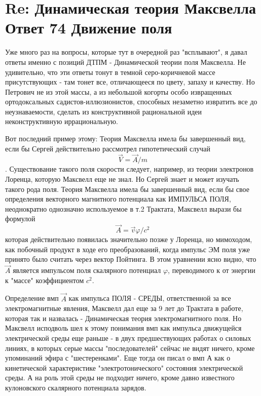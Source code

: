 \documentclass{article}
\begin{document}
\section{Re: Динамическая теория Максвелла Ответ 74  Движение поля}
Уже много раз  на вопросы, которые тут в очередной раз "всплывают", я давал  ответы именно с позиций ДТПМ - Динамической теории поля Максвелла.
Не удивительно, что эти ответы тонут в темной серо-коричневой массе присутствующих - там тонет все, отличающееся по цвету, запаху и качеству.
Но Петрович не из этой массы, а из небольшой когорты особо извращенных ортодоксальных садистов-иллюзионистов, способных незаметно извратить все до неузнаваемости, сделать из конструктивной рациональной идеи неконструктивную иррациональную.

Вот последний пример этому:
Теория Максвелла имела бы завершенный вид, если бы Сергей действительно рассмотрел гипотетический случай
$$\vec V=\vec A/m$$.
Существование такого поля скорости следует, например, из теории электронов Лоренца, которую Максвелл еще не знал.  Но Сергей знает и может изучать такого рода поля. %
Теория Максвелла имела бы завершенный вид, если бы свое определения векторного магнитного потенциала как ИМПУЛЬСА ПОЛЯ, неоднократно  однозначно используемое в т.2 Трактата, Максвелл вырази бы формулой
$$\vec A = \vec v \varphi /c^2$$
которая действительно появилась значительно позже у Лоренца, но мимоходом, как побочный продукт в ходе его преобразований, когда импульс ЭМ поля уже принято было считать через вектор Пойтинга.
В этом уравнении ясно видно, что $\vec A$ является импульсом поля скалярного потенциал $\varphi$, переводимого к от энергии к "массе" коэффициентом $c^2$. 

Определение вмп $\vec A$ как импульса ПОЛЯ - СРЕДЫ, ответственной за все электромагнитные явления, Максвелл дал еще за 9 лет до Трактата в работе, которая так и назвалась - Динамическая теория электромагнитного поля.
Но Максвелл исподволь шел к этому понимания вмп как импульса движущейся электрической среды еще раньше - в двух предшествующих работах о силовых линиях, в которых серые массы "последователей" сейчас не видят ничего, кроме упоминаний эфира с "шестеренками". Еще тогда он писал о вмп А как о кинетической характеристике "электротонического" состояния электрической среды.
А на роль  этой среды не подходит ничего, кроме давно известного кулоновского скалярного потенциала зарядов.
\end{document}
